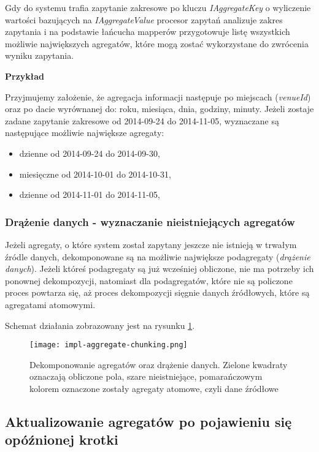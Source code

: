 Gdy do systemu trafia zapytanie zakresowe po kluczu \emph{IAggregateKey} o wyliczenie wartości bazujących na \emph{IAggregateValue} procesor zapytań analizuje zakres zapytania i na podstawie łańcucha mapperów przygotowuje listę wszystkich możliwie największych agregatów, które mogą zostać wykorzystane do zwrócenia wyniku zapytania.

\textbf{Przykład}

Przyjmujemy założenie, że agregacja informacji następuje po miejscach (\emph{venueId}) oraz po dacie wyrównanej do: roku, miesiąca, dnia, godziny, minuty. Jeżeli zostaje zadane zapytanie zakresowe od 2014-09-24 do 2014-11-05, wyznaczane są następujące możliwie największe agregaty:

\begin{itemize}[noitemsep]
\item dzienne od 2014-09-24 do 2014-09-30,
\item miesięczne od 2014-10-01 do 2014-10-31,
\item dzienne od 2014-11-01 do 2014-11-05,
\end{itemize}

\subsubsection{Drążenie danych - wyznaczanie nieistniejących agregatów}
\label{sec:impl-mal-computing-aggregates}

Jeżeli agregaty, o które system został zapytany jeszcze nie istnieją w trwałym źródle danych, dekomponowane są na możliwie największe podagregaty (\emph{drążenie danych}). Jeżeli któreś podagregaty są już wcześniej obliczone, nie ma potrzeby ich ponownej dekompozycji, natomiast dla podagregatów, które nie są policzone proces powtarza się, aż proces dekompozycji sięgnie danych źródłowych, które są agregatami atomowymi.

Schemat działania zobrazowany jest na rysunku \ref{fig:impl-aggregate-chunking}.

\begin{figure}[h!]
\centering
\texttt{[image: impl-aggregate-chunking.png]}
\caption{Dekomponowanie agregatów oraz drążenie danych. Zielone kwadraty oznaczają obliczone pola, szare nieistniejące, pomarańczowym kolorem oznaczone zostały agregaty atomowe, czyli dane źródłowe}
\label{fig:impl-aggregate-chunking}
\end{figure}

\subsection{Aktualizowanie agregatów po pojawieniu się opóźnionej krotki}

